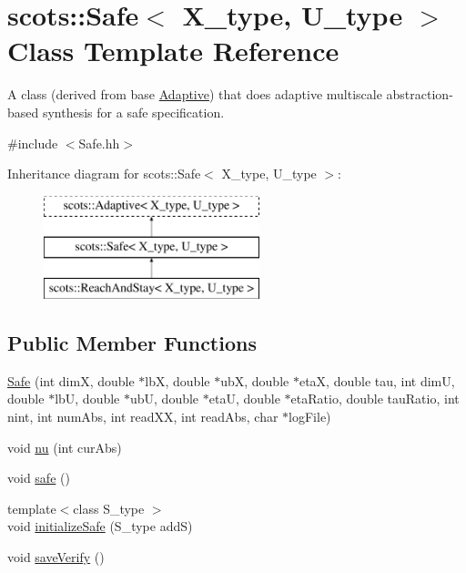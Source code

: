 \hypertarget{classscots_1_1Safe}{}\section{scots\+:\+:Safe$<$ X\+\_\+type, U\+\_\+type $>$ Class Template Reference}
\label{classscots_1_1Safe}


A class (derived from base \hyperlink{classscots_1_1Adaptive}{Adaptive}) that does adaptive multiscale abstraction-\/based synthesis for a safe specification.  




{\ttfamily \#include $<$Safe.\+hh$>$}

Inheritance diagram for scots\+:\+:Safe$<$ X\+\_\+type, U\+\_\+type $>$\+:\begin{figure}[H]
\begin{center}
\leavevmode
\includegraphics[height=3.000000cm]{classscots_1_1Safe}
\end{center}
\end{figure}
\subsection*{Public Member Functions}
\begin{DoxyCompactItemize}
\item 
\hyperlink{classscots_1_1Safe_a40024a9098c70cebc5842a09b46448b8}{Safe} (int dimX, double $\ast$lbX, double $\ast$ubX, double $\ast$etaX, double tau, int dimU, double $\ast$lbU, double $\ast$ubU, double $\ast$etaU, double $\ast$eta\+Ratio, double tau\+Ratio, int nint, int num\+Abs, int read\+XX, int read\+Abs, char $\ast$log\+File)
\item 
void \hyperlink{classscots_1_1Safe_ac9f2578f6b74602510ca5db4b2ef31b9}{nu} (int cur\+Abs)
\item 
void \hyperlink{classscots_1_1Safe_af5ea22ef6bd1f86dd1a6f7ef6e590492}{safe} ()
\item 
{\footnotesize template$<$class S\+\_\+type $>$ }\\void \hyperlink{classscots_1_1Safe_a8255c8172548f64907fedaddfcae9519}{initialize\+Safe} (S\+\_\+type addS)
\item 
void \hyperlink{classscots_1_1Safe_ab6866ae8860c91feb49467556f0a8598}{save\+Verify} ()
\end{DoxyCompactItemize}
